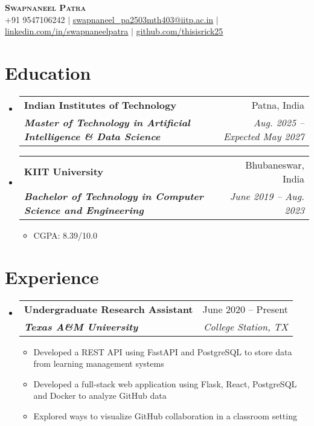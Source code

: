 \documentclass[letterpaper,11pt]{article}
\makeatletter
\newcommand{\resumeItem}[1]{
  \item\small{
    {#1 \vspace{-2pt}}
  }
}
\newcommand{\resumeSubheading}[4]{
  \vspace{-2pt}\item
    \begin{tabular*}{\textwidth}[t]{l@{\extracolsep{\fill}}r}
      \textbf{#1} & #2 \\
      \textbf{\textit{\small#3}} & \textit{\small #4} \\
    \end{tabular*}\vspace{-7pt}
}
\newcommand{\resumeSubSubheading}[2]{
    \item
    \begin{tabular*}{\textwidth}{l@{\extracolsep{\fill}}r}
      \textit{\small#1} & \textit{\small #2} \\
    \end{tabular*}\vspace{-7pt}
}
\newcommand{\resumeSubHeadingListStart}{\begin{itemize}[leftmargin=0in, label={}]}
\newcommand{\resumeSubHeadingListEnd}{\end{itemize}}
\newcommand{\resumeItemListStart}{\begin{itemize}}
\newcommand{\resumeItemListEnd}{\end{itemize}\vspace{-5pt}}
\makeatother
\begin{document}
\begin{center}
  \textbf{\Huge \scshape Swapnaneel Patra} \\ \vspace{1pt}
  \small +91 9547106242 $|$
  \href{mailto:swapnaneel_pa2503mth403@iitp.ac.in}{\underline{swapnaneel\_pa2503mth403@iitp.ac.in}} $|$
  \href{https://linkedin.com/in/swapnaneelpatra}{\underline{linkedin.com/in/swapnaneelpatra}} $|$
  \href{https://github.com/thisisrick25}{\underline{github.com/thisisrick25}}
\end{center}


\section{Education}
\resumeSubHeadingListStart
\resumeSubheading
{Indian Institutes of Technology}{Patna, India}
{Master of Technology in Artificial Intelligence \& Data Science}{Aug. 2025 -- Expected May 2027}
\resumeSubheading
{KIIT University}{Bhubaneswar, India}
{Bachelor of Technology in Computer Science and Engineering}
{June 2019 -- Aug. 2023}
\resumeItemListStart
\resumeItem{CGPA: 8.39/10.0}
\resumeItemListEnd
\resumeSubHeadingListEnd


\section{Experience}
\resumeSubHeadingListStart

\resumeSubheading
{Undergraduate Research Assistant}{June 2020 -- Present}
{Texas A\&M University}{College Station, TX}
\resumeItemListStart
\resumeItem{Developed a REST API using FastAPI and PostgreSQL to store data from learning management systems}
\resumeItem{Developed a full-stack web application using Flask, React, PostgreSQL and Docker to analyze GitHub data}
\resumeItem{Explored ways to visualize GitHub collaboration in a classroom setting}
\resumeItemListEnd


\resumeSubHeadingListEnd


\end{document}
